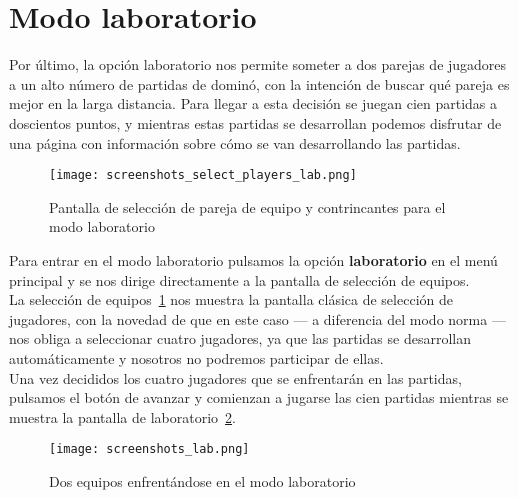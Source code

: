 \section{Modo laboratorio}

Por último, la opción laboratorio nos permite someter a dos parejas de jugadores a un alto número de partidas
de dominó, con la intención de buscar qué pareja es mejor en la larga distancia. Para llegar a esta decisión se
juegan cien partidas a doscientos puntos, y mientras estas partidas se desarrollan podemos disfrutar de una página
con información sobre cómo se van desarrollando las partidas. \\

\begin{figure}[hp]
  \begin{center}
    \texttt{[image: screenshots\_select\_players\_lab.png]}
  \end{center}
  \caption{Pantalla de selección de pareja de equipo y contrincantes para el modo laboratorio}
  \label{fig:screenshotsselectplayerslab}
\end{figure}

Para entrar en el modo laboratorio pulsamos la opción \textbf{laboratorio} en el menú principal y se nos dirige directamente
a la pantalla de selección de equipos. \\

La selección de equipos~\ref{fig:screenshotsselectplayerslab} nos muestra la pantalla clásica de selección de jugadores,
con la novedad de que en este caso --- a diferencia del modo norma --- nos obliga a seleccionar cuatro jugadores, ya que
las partidas se desarrollan automáticamente y nosotros no podremos participar de ellas. \\

Una vez decididos los cuatro jugadores que se enfrentarán en las partidas, pulsamos el botón de avanzar y comienzan
a jugarse las cien partidas mientras se muestra la pantalla de laboratorio~\ref{fig:screenshots_lab}. \\
 
\begin{figure}[hp]
  \begin{center}
    \texttt{[image: screenshots\_lab.png]}
  \end{center}
  \caption{Dos equipos enfrentándose en el modo laboratorio}
  \label{fig:screenshots_lab}
\end{figure}

